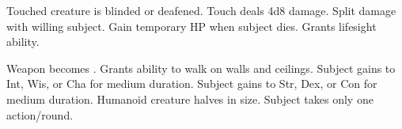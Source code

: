 \begin{swspelllist}
   Touched creature is blinded or deafened.
   Touch deals 4d8 damage.
   Split damage with willing subject.
   Gain temporary HP when subject dies.
   Grants lifesight ability. 

   Weapon becomes .
   Grants ability to walk on walls and ceilings.
   Subject gains  to Int, Wis, or Cha for medium duration.
   Subject gains  to Str, Dex, or Con for medium duration.
   Humanoid creature halves in size.
   Subject takes only one action/round.
\end{swspelllist}

